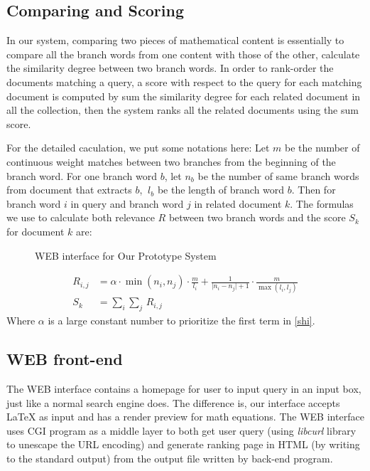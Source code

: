 \documentclass{acm_proc_article-sp}
\begin{document}
\subsection{Comparing and Scoring}
In our system, comparing two pieces of mathematical content is essentially to compare all the branch words from one content with those of the other, calculate the similarity degree between two branch words. In order to rank-order the documents matching a query, a score with respect to the query for each matching document is computed by sum the similarity degree for each related document in all the collection, then the system ranks all the related documents using the sum score.

For the detailed caculation, we put some notations here: Let $m$ be the number of continuous weight matches between two branches from the beginning of the branch word. For one branch word $b$, let $n_b$ be the number of same branch words from document that extracts $b$, $\  l_b$ be the length of branch word $b$. Then for branch word $i$ in query and branch word $j$ in related document $k$. The formulas we use to calculate both relevance $R$ between two branch words and the score $S_k$ for document $k$ are:
\begin{figure*}
\centering
{}
\caption{WEB interface for Our Prototype System}
\end{figure*}

\begin{align}
\label{shi}
R_{i,j} &= \alpha \cdot \min(n_i, n_j) \cdot \frac{m}{l_i} + \frac{1}{\lvert n_i - n_j \rvert + 1} \cdot \frac{m}{\max(l_i, l_j)} \\
S_k &= \sum_{i}\sum_{j}\,R_{i,j}
\end{align}
Where $\alpha$ is a large constant number to prioritize the first term in \eqref{shi}.

\subsection{WEB front-end}
The WEB interface contains a homepage for user to input query in an input box, just like a normal search engine does. The difference is, our interface accepts \LaTeX{} as input and has a render preview for math equations. The WEB interface uses CGI program as a middle layer to both get user query (using \textit{libcurl} library to unescape the URL encoding) and generate ranking page in HTML (by writing to the standard output) from the output file written by back-end program.
\end{document}
